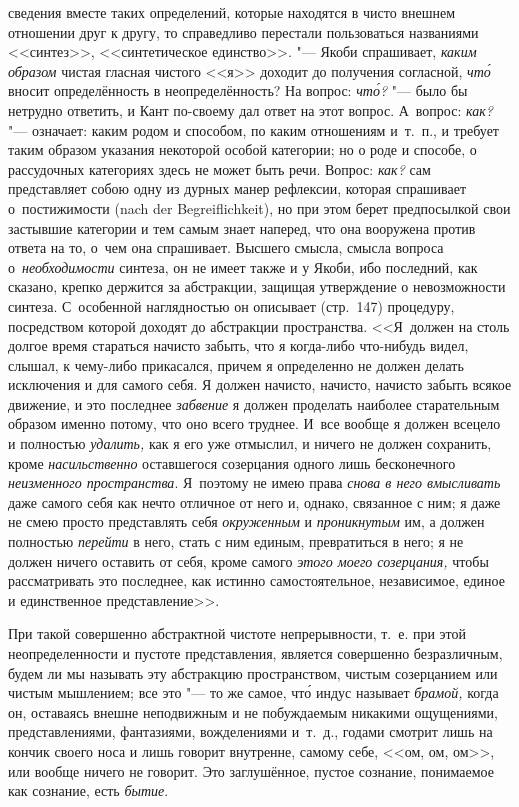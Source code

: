 сведения вместе таких определений, которые находятся в чисто внешнем отношении
друг к другу, то справедливо перестали пользоваться названиями <<синтез>>,
<<синтетическое единство>>. "--- Якоби спрашивает, {\em каким образом}
чистая гласная чистого <<я>> доходит до получения согласной, {\em чт\'{о}}
вносит определённость в неопределённость? На вопрос: {\em чт\'{о}?} "--- было бы
нетрудно ответить, и Кант по-своему дал ответ на этот вопрос. А~вопрос:
{\em как?} "--- означает: каким родом и способом, по каким отношениям и~т.~п.,
и требует таким образом указания некоторой особой категории; но о роде и
способе, о рассудочных категориях здесь не может быть речи. Вопрос: {\em как?}
сам представляет собою одну из дурных манер рефлексии, которая спрашивает
о~постижимости (nach der Begrei\-flich\-keit), но при этом берет предпосылкой
свои застывшие категории и тем самым знает наперед, что она вооружена против
ответа на то, о~чем она спрашивает. Высшего смысла, смысла вопроса
о~{\em необходимости} синтеза, он не имеет также и у Якоби, ибо последний, как
сказано, крепко держится за абстракции, защищая утверждение о невозможности
синтеза. С~особенной наглядностью он описывает (стр.~147) процедуру,
посредством которой доходят до абстракции пространства. <<Я~должен на столь
долгое время стараться начисто забыть, что я когда-либо что-нибудь видел,
слышал, к чему-либо прикасался, причем я определенно не должен делать
исключения и для самого себя. Я должен начисто, начисто, начисто забыть всякое
движение, и это последнее {\em забвение} я должен проделать наиболее
старательным образом именно потому, что оно всего труднее. И~все вообще я
должен всецело и полностью {\em удалить,} как я его уже отмыслил, и ничего не
должен сохранить, кроме {\em насильственно} оставшегося созерцания одного лишь
бесконечного {\em неизменного пространства}. Я~поэтому не имею права
{\em снова в него вмысливать} даже самого себя как нечто отличное от него и,
однако, связанное с ним; я даже не смею просто представлять себя
{\em окруженным} и {\em проникнутым} им, а должен полностью {\em перейти} в
него, стать с ним единым, превратиться в него; я не должен ничего оставить от
себя, кроме самого {\em этого моего созерцания,} чтобы рассматривать это
последнее, как истинно самостоятельное, независимое, единое и единственное
представление>>.

При такой совершенно абстрактной чистоте непрерывности, т.~е. при этой
неопределенности и пустоте представления, является совершенно безразличным,
будем ли мы называть эту абстракцию пространством, чистым созерцанием или
чистым мышлением; все это "--- то же самое, чт\'{о} индус называет
{\em брамой,} когда он, оставаясь внешне неподвижным и не побуждаемым
никакими ощущениями, представлениями, фантазиями, вожделениями и~т.~д.,
годами смотрит лишь на кончик своего носа и лишь говорит внутренне, самому
себе, <<ом, ом, ом>>, или вообще ничего не говорит. Это заглушённое, пустое
сознание, понимаемое как сознание, есть {\em бытие}.

